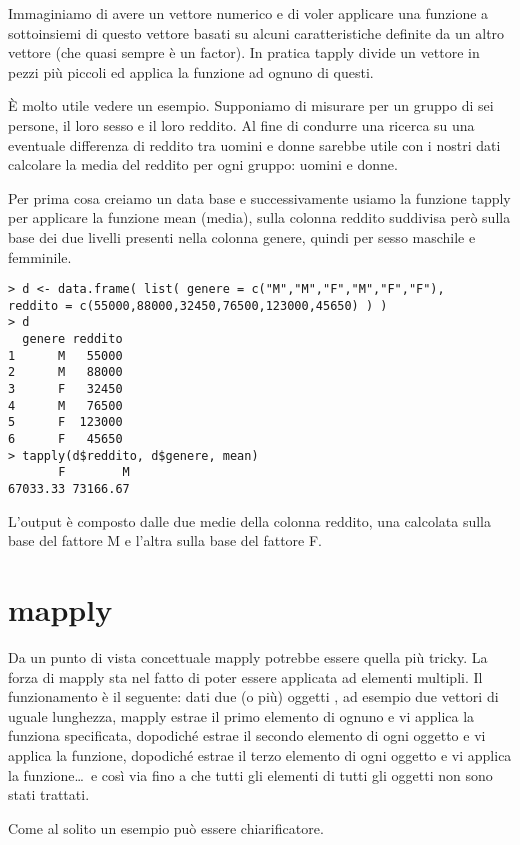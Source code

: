 Immaginiamo di avere un vettore numerico e di voler applicare una funzione a sottoinsiemi di questo vettore basati su alcuni caratteristiche definite da un altro vettore (che quasi sempre è un factor). In pratica \textsf{tapply} divide un vettore in pezzi più piccoli ed applica la funzione ad ognuno di questi.

È molto utile vedere un esempio. Supponiamo di misurare per un gruppo di sei persone, il loro sesso e il loro reddito. Al fine di condurre una ricerca su una eventuale differenza di reddito tra uomini e donne sarebbe utile con i nostri dati calcolare la media del reddito per ogni gruppo: uomini e donne.

Per prima cosa creiamo un data base e successivamente usiamo la funzione
\textsf{tapply} per applicare la funzione \textsf{mean} (media), sulla colonna reddito suddivisa però sulla base dei due livelli presenti nella colonna genere, quindi per sesso maschile e femminile.

\begin{lstlisting}
> d <- data.frame( list( genere = c("M","M","F","M","F","F"), 
reddito = c(55000,88000,32450,76500,123000,45650) ) )
> d
  genere reddito
1      M   55000
2      M   88000
3      F   32450
4      M   76500
5      F  123000
6      F   45650
> tapply(d$reddito, d$genere, mean)
       F        M 
67033.33 73166.67
\end{lstlisting}

L'output è composto dalle due medie della colonna reddito, una calcolata sulla base del fattore M e l'altra sulla base del fattore F.


\section{mapply}

Da un punto di vista concettuale \textsf{mapply} potrebbe essere quella più tricky. La forza di \textsf{mapply} sta nel fatto di poter essere applicata ad elementi multipli. Il funzionamento è il seguente: dati due (o più) oggetti \erre, ad esempio due vettori di uguale lunghezza, \textsf{mapply} estrae il primo elemento di ognuno e vi applica la funziona specificata, dopodiché estrae il secondo elemento di ogni oggetto e vi applica la funzione, dopodiché estrae il terzo elemento di ogni oggetto e vi applica la funzione\dots\ e così via fino a che tutti gli elementi di tutti gli oggetti non sono stati trattati.

Come al solito un esempio può essere chiarificatore.

